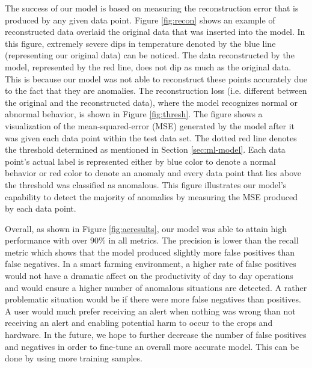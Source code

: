 The success of our model is based on measuring the reconstruction error that is produced by any given data point. Figure \ref{fig:recon} shows an example of reconstructed data overlaid the original data that was inserted into the model. %
In this figure, extremely severe dips in temperature denoted by the blue line (representing our original data) can be noticed. The data reconstructed by the model, represented by the red line, does not dip as much as the original data. This is because our model was not able to reconstruct these points accurately due to the fact that they are anomalies. The reconstruction loss (i.e. different between the original and the reconstructed data), where the model recognizes normal or abnormal behavior, is shown in Figure \ref{fig:thresh}. The figure shows a visualization of the mean-squared-error (MSE) generated by the model after it was given each data point within the test data set. The dotted red line denotes the threshold determined as mentioned in Section \ref{sec:ml-model}. Each data point's actual label is represented either by blue color to denote a normal behavior or red color to denote an anomaly and every data point that lies above the threshold was classified as anomalous. This figure illustrates our model's capability to detect the majority of anomalies by measuring the MSE produced by each data point.

Overall, as shown in Figure \ref{fig:aeresults}, our model was able to attain high performance with over $90\%$ in all metrics. The precision is lower than the recall metric which shows that the model produced slightly more false positives than false negatives. In a smart farming environment, a higher rate of false positives would not have a dramatic affect on the productivity of day to day operations and would ensure a higher number of anomalous situations are detected. A rather problematic situation would be if there were more false negatives than positives. A user would much prefer receiving an alert when nothing was wrong than not receiving an alert and enabling potential harm to occur to the crops and hardware. In the future, we hope to further decrease the number of false positives and negatives in order to fine-tune an overall more accurate model. This can be done by using more training samples.


